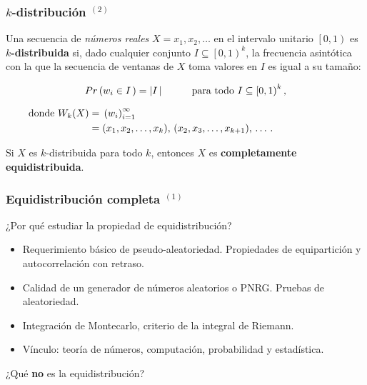 \documentclass[t, 10pt, mathserif]{beamer}
\begin{document}
\begin{frame}
  \frametitle{$k$-distribución {$^{(2)}$}}

  \begin{definition}
    Una secuencia de \textit{números reales} $X = x_1, x_2, \dots$ en el intervalo unitario $\left[0, 1\right)$ es \textbf{$k$-distribuida} si, dado cualquier conjunto $I \subseteq \left[0, 1\right)^k$, la frecuencia asintótica con la que la secuencia de ventanas de $X$ toma valores en $I$ es igual a su tamaño:
    \pause

    \begin{equation*}
      \begin{aligned}
        Pr \left( w_i \in I\, \right) = \left| I\, \right| \hspace*{1cm} \text{para todo } I \subseteq \left[0, 1\right)^k \text{,}
      \end{aligned}
    \end{equation*}
    \pause

    \vspace{-0.5cm}
    \begin{equation*}
      \hspace{-2.5cm}
      \begin{aligned}
          \text{donde } W_k(X) =\; & \left( w_i \right)_{i = 1}^{\infty} \\
                               =\; & (x_1, x_2, \dots, x_k      ),\, (x_2, x_3, \dots, x_{k + 1}),\, \dots \, \text{.}
      \end{aligned}
    \end{equation*}
    \vspace{-0.3cm}
  \end{definition}
  \pause

  Si $X$ es $k$-distribuida para todo $k$, entonces $X$ es \textbf{completamente equidistribuida}.
\end{frame}


\begin{frame}
  \frametitle{Equidistribución completa {$^{(1)}$}}

  ¿Por qué estudiar la propiedad de equidistribución?

  \begin{itemize}
    \item Requerimiento básico de pseudo-aleatoriedad. Propiedades de equipartición y autocorrelación con retraso. \pause
    \item Calidad de un generador de números aleatorios o PNRG. Pruebas de aleatoriedad.\pause %
    \item Integración de Montecarlo, criterio de la integral de Riemann. \pause
    \item Vínculo: teoría de números, computación, probabilidad y estadística.
  \end{itemize}
  \pause

  ¿Qué \textbf{no} es la equidistribución?
\end{frame}
 
\end{document}
